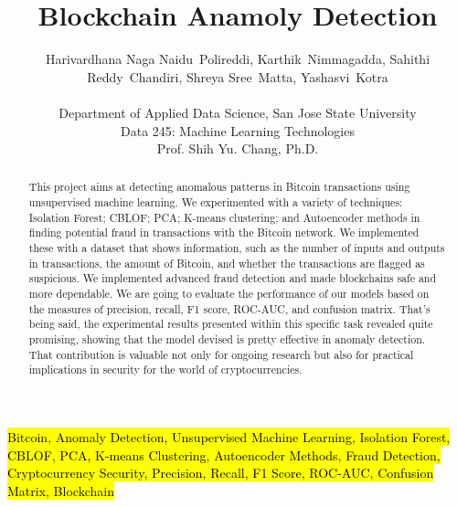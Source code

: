 \documentclass[journal]{IEEEtran}
\begin{document}
\title{Blockchain Anamoly Detection}
\author{
    Harivardhana Naga Naidu~Polireddi,
    Karthik~Nimmagadda,
    Sahithi Reddy~Chandiri,
    Shreya Sree~Matta,
    Yashasvi~Kotra\\
    \\
    Department of Applied Data Science, San Jose State University\\
    Data 245: Machine Learning Technologies\\
    Prof. Shih Yu. Chang, Ph.D.
}

\maketitle


\vspace{-30pt}

\begin{abstract}
This project aims at detecting anomalous patterns in Bitcoin transactions using unsupervised machine learning. We experimented with a variety of techniques: Isolation Forest; CBLOF; PCA; K-means clustering; and Autoencoder methods in finding potential fraud in transactions with the Bitcoin network. We implemented these with a dataset that shows information, such as the number of inputs and outputs in transactions, the amount of Bitcoin, and whether the transactions are flagged as suspicious. We implemented advanced fraud detection and made blockchains safe and more dependable. We are going to evaluate the performance of our models based on the measures of precision, recall, F1 score, ROC-AUC, and confusion matrix. That's being said, the experimental results presented within this specific task revealed quite promising, showing that the model devised is pretty effective in anomaly detection. That contribution is valuable not only for ongoing research but also for practical implications in security for the world of cryptocurrencies.
\end{abstract}

\begin{IEEEkeywords}
\hl{Bitcoin, Anomaly Detection, Unsupervised Machine Learning, Isolation Forest, CBLOF, PCA, K-means Clustering, Autoencoder Methods, Fraud Detection, Cryptocurrency Security, Precision, Recall, F1 Score, ROC-AUC, Confusion Matrix, Blockchain}
\end{IEEEkeywords}
\end{document}
